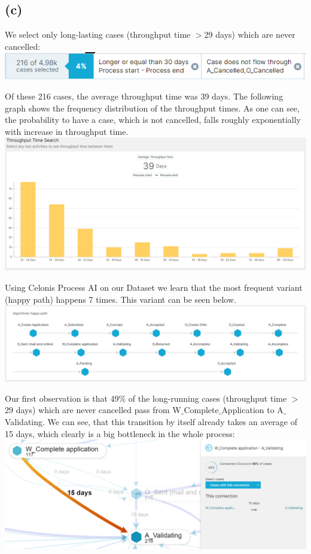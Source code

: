 \documentclass[../../main.tex]{subfiles}
\begin{document}
\subsection*{(c)}
We select only long-lasting cases (throughput time $>$29 days) which are never cancelled:
\includegraphics[width=\textwidth]{img/QUESTION_5c_selection.png}

Of these 216 cases, the average throughput time was 39 days. The following graph shows the frequency distribution of the throughput times. As one can see, the probability to have a case, which is not cancelled, falls roughly exponentially with increase in throughput time.\\
\includegraphics[width=\textwidth]{img/QUESTION_5c_throughput_time.png}

Using Celonis Process AI on our Dataset we learn that the most frequent variant (happy path) happens 7 times. This variant can be seen below.\\
\includegraphics[width=\textwidth]{img/QUESTION_5c_happy_path.png}

Our first observation is that 49\% of the long-running cases (throughput time $>$29 days) which are never cancelled pass from W$\_$Complete$\_$Application to A$\_$Validating. We can see, that this transition by itself already takes an average of 15 days, which clearly is a big bottleneck in the whole process:\\
\includegraphics[width=\textwidth]{img/QUESTION_5c_W_Complete.png}
\end{document}
